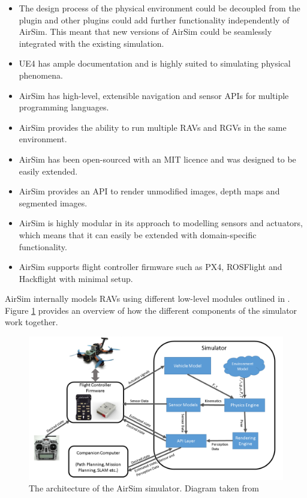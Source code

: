 \begin{itemize}
\item The design process of the physical environment could be decoupled from the plugin and other plugins could add further functionality independently of AirSim. This meant that new versions of AirSim could be seamlessly integrated with the existing simulation.

\item UE4 has ample documentation and is highly suited to simulating physical phenomena.

\item AirSim has high-level, extensible navigation and sensor APIs for multiple programming languages.

\item AirSim provides the ability to run multiple RAVs and RGVs in the same environment.

\item AirSim has been open-sourced with an MIT licence and was designed to be easily extended.

\item AirSim  provides an API to render unmodified images, depth maps and segmented images.

\item AirSim is highly modular in its approach to modelling sensors and actuators, which means that it can easily be extended with domain-specific functionality.

\item AirSim supports flight controller firmware such as PX4, ROSFlight and Hackflight with minimal setup.

\end{itemize}
AirSim internally models RAVs using different low-level modules outlined in \cite{Shah2017AirSim:Vehicles}. Figure  \ref{fig:AirSimArchitecture} provides an overview of how the different components of the simulator work together.

\begin{figure}
    \centering
    \includegraphics[width=0.75\linewidth]{Chapters/SimulationEnv/Figs/AirSimArchitecture/AirSimArchitecture.png}
    \caption{The architecture of the AirSim simulator. Diagram taken from \cite{Shah2017AirSim:Vehicles}}
    \label{fig:AirSimArchitecture}
\end{figure}



